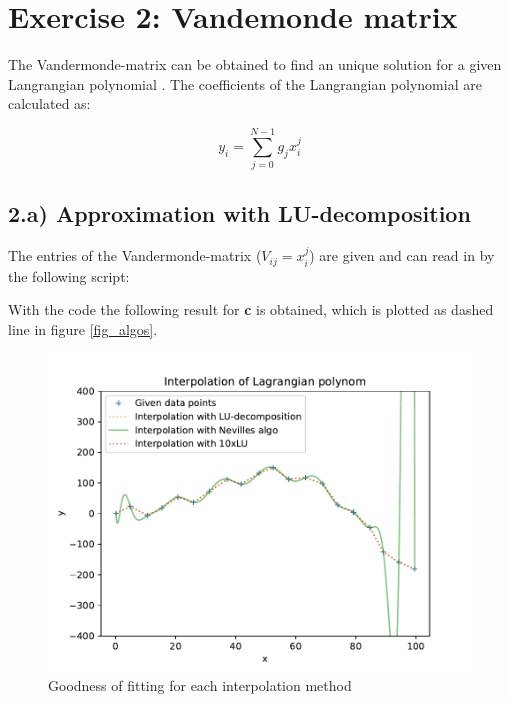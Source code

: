 \section{Exercise 2: Vandemonde matrix}

The Vandermonde-matrix can be obtained to find an unique solution for a given  Langrangian polynomial .
The coefficients of the Langrangian polynomial are calculated as:

\begin{equation}
	y_i = \sum_{j=0}^{N-1} g_j x_i^j
\end{equation}

\subsection{2.a) Approximation with LU-decomposition}

The entries of the Vandermonde-matrix ($V_{ij} = x_i^j$) are given and can read in by the following script:
 


With the code the following result for \textbf{c} is obtained, which is plotted as dashed line in figure \ref{fig_algos}.


\begin{figure}
    \centering
    \includegraphics{./plots/2_Interpolation_Algos.pdf}
    \caption{Goodness of fitting for each interpolation method}
    \label{fig:algos}
\end{figure}


